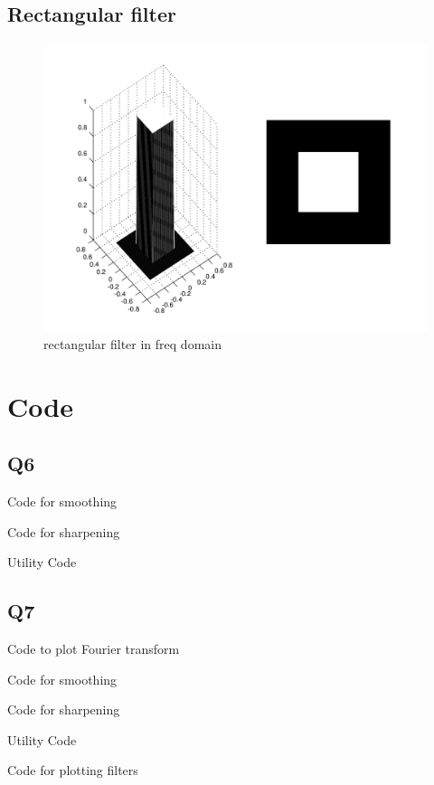 \documentclass{article}
\begin{document}
	\subsection{Rectangular filter}
	\begin{figure}[H]
		\includegraphics[width=\linewidth]{Q7/partE.png}
		\caption{rectangular filter in freq domain}
	\end{figure}
	
	\newpage
	\section{Code}
	\subsection{Q6}
	Code for smoothing
	
	\newpage
	
	Code for sharpening
	
	\newpage
	
	Utility Code
	
	\newpage
	
	\subsection{Q7}
	Code to plot Fourier transform
	
	\newpage
	
	Code for smoothing
	
	\newpage
	
	Code for sharpening
	
	
	\newpage
	Utility Code
	
	
	\newpage
	Code for plotting filters
	
	
	
\end{document}
